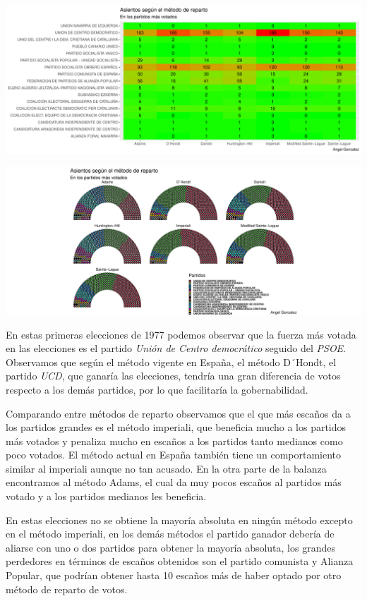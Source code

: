 \documentclass[12pt,a4paper,]{book}
\numberwithin{dummy}{section}
\theoremstyle{ocrenumbox}
\theoremstyle{blacknumex}
\theoremstyle{blacknumbox}
\theoremstyle{ocrenum}
\theoremstyle{ocrenum}
\begin{document}
\begin{center}\includegraphics[width=0.95\linewidth]{figurasR/unnamed-chunk-59-2} \end{center}

\begin{center}\includegraphics[width=0.95\linewidth]{figurasR/unnamed-chunk-59-3} \end{center}

En estas primeras elecciones de 1977 podemos observar que la fuerza más
votada en las elecciones es el partido \emph{Unión de Centro
democrático} seguido del \emph{PSOE}. Observamos que según el método
vigente en España, el método D´Hondt, el partido \emph{UCD}, que ganaría
las elecciones, tendría una gran diferencia de votos respecto a los
demás partidos, por lo que facilitaría la gobernabilidad.

Comparando entre métodos de reparto observamos que el que más escaños da
a los partidos grandes es el método imperiali, que beneficia mucho a los
partidos más votados y penaliza mucho en escaños a los partidos tanto
medianos como poco votados. El método actual en España también tiene un
comportamiento similar al imperiali aunque no tan acusado. En la otra
parte de la balanza encontramos al método Adams, el cual da muy pocos
escaños al partidos más votado y a los partidos medianos les beneficia.

En estas elecciones no se obtiene la mayoría absoluta en ningún método
excepto en el método imperiali, en los demás métodos el partido ganador
debería de aliarse con uno o dos partidos para obtener la mayoría
absoluta, los grandes perdedores en términos de escaños obtenidos son el
partido comunista y Alianza Popular, que podrían obtener hasta 10
escaños más de haber optado por otro método de reparto de votos.
\end{document}
